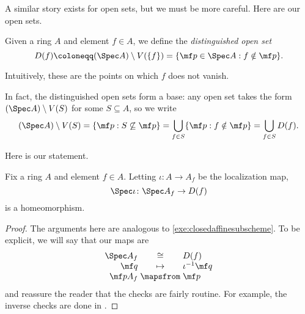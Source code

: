\documentclass[../notes.tex]{subfiles}
\begin{document}
A similar story exists for open sets, but we must be more careful. Here are our open sets.
\begin{definition}
	Given a ring $A$ and element $f\in A$, we define the \textit{distinguished open set}
	\[D(f)\coloneqq(\Spec A)\setminus V(\{f\})=\{\mf p\in\Spec A:f\notin\mf p\}.\]
\end{definition}
Intuitively, these are the points on which $f$ does not vanish.
\begin{remark} \label{rem:distinguishedbase}
	In fact, the distinguished open sets form a base: any open set takes the form $(\Spec A)\setminus V(S)$ for some $S\subseteq A$, so we write
	\[(\Spec A)\setminus V(S)=\{\mf p:S\not\subseteq\mf p\}=\bigcup_{f\in S}\{\mf p:f\notin\mf p\}=\bigcup_{f\in S}D(f).\]
\end{remark}
Here is our statement.
\begin{exe} \label{exe:distinguishedisaffine}
	Fix a ring $A$ and element $f\in A$. Letting $\iota\colon A\to A_f$ be the localization map,
	\[\Spec\iota\colon\Spec A_f\to D(f)\]
	is a homeomorphism.
\end{exe}
\begin{proof}
	The arguments here are analogous to \autoref{exe:closedaffinesubscheme}. To be explicit, we will say that our maps are
	\[\arraycolsep=1.4pt\begin{array}{rcl}
		\Spec A_f &\cong& D(f) \\
		\mf q &\mapsto& \iota^{-1}\mf q \\
		\mf pA_f &\mapsfrom& \mf p
	\end{array}\]
	and reassure the reader that the checks are fairly routine. For example, the inverse checks are done in \cite[Proposition~2.2]{eisenbud-comm-alg}.
\end{proof}
\end{document}
